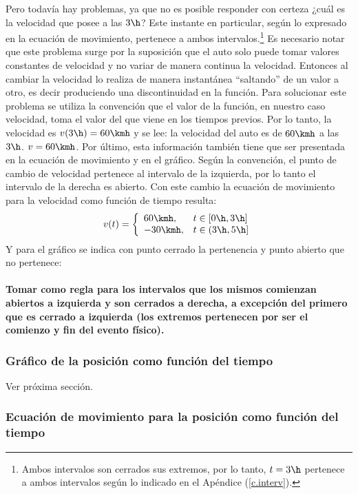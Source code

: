Pero todavía hay problemas, ya que no es posible responder con certeza ¿cuál es
la velocidad que posee a las $3\h$? Este instante en particular, según lo
expresado en la ecuación de movimiento, pertenece a ambos
intervalos.\footnote{Ambos intervalos son cerrados sus extremos, por lo tanto,
$t=3\h$ pertenece a ambos intervalos según lo indicado en el Apéndice
(\ref{c.interv}).} Es necesario notar que este problema surge por la suposición
que el auto solo puede tomar valores constantes de velocidad y no variar de
manera continua la velocidad. Entonces al cambiar la velocidad lo realiza de
manera instantánea ``saltando'' de un valor a otro, es decir produciendo una
discontinuidad en la función. Para solucionar este problema se utiliza la
convención que el valor de la función, en nuestro caso velocidad, toma el valor
del que viene en los tiempos previos. Por lo tanto, la velocidad es
$v(3\h)=60\kmh$ y se lee: la velocidad del auto es de $60\kmh$ a las $3\h$.
$v=60\kmh$.
Por último, esta información también tiene que ser presentada en la ecuación de
movimiento y en el gráfico. Según la convención, el punto de cambio de velocidad
pertenece al intervalo de la izquierda, por lo tanto el intervalo de la derecha
es abierto. Con este cambio la ecuación de movimiento para la velocidad como
función de tiempo resulta:
\[
v(t) = \left\{ 
\begin{array}{ll}
  60\kmh, & t \in [0\h,3\h] \\
  -30\kmh, & t \in (3\h,5\h] \\
\end{array}
\right.
\]
Y para el gráfico se indica con punto cerrado la pertenencia y punto abierto que
no pertenece:


\finej
\paragraph{Tomar como regla para los intervalos que los mismos comienzan
abiertos a izquierda y son cerrados a derecha, a excepción del primero que es
cerrado a izquierda (los extremos pertenecen por ser el comienzo y fin del
evento físico).\\}

\subsubsection{Gráfico de la posición como función del tiempo}
\label{c.xxt}

Ver próxima sección.

\subsubsection{Ecuación de movimiento para la posición como función del tiempo}
\label{c.exxt}


